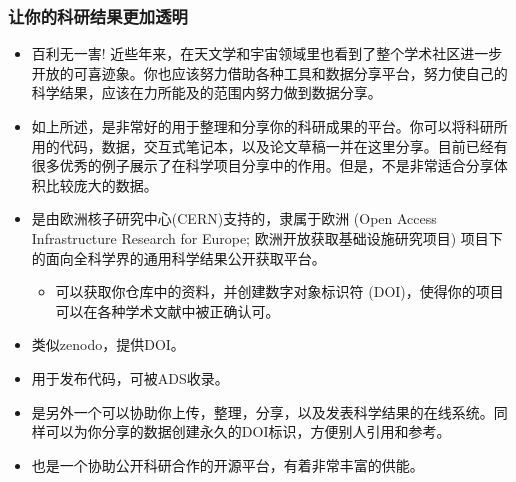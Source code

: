\documentclass[letterpaper,10pt,english]{sphinxmanual}
\begin{document}
\subsubsection{让你的科研结果更加透明}
\label{\detokenize{resource/research/getting_started_cn:id12}}\begin{itemize}
\item {} 
百利无一害!
近些年来，在天文学和宇宙领域里也看到了整个学术社区进一步开放的可喜迹象。你也应该努力借助各种工具和数据分享平台，努力使自己的科学结果，应该在力所能及的范围内努力做到数据分享。

\item {} 
如上所述，是非常好的用于整理和分享你的科研成果的平台。你可以将科研所用的代码，数据，交互式笔记本，以及论文草稿一并在这里分享。目前已经有很多优秀的例子展示了在科学项目分享中的作用。但是，不是非常适合分享体积比较庞大的数据。

\item {} 
是由欧洲核子研究中心(CERN)支持的，隶属于欧洲 (Open
Access Infrastructure Research for Europe;
欧洲开放获取基础设施研究项目)
项目下的面向全科学界的通用科学结果公开获取平台。
\begin{itemize}
\item {} 
可以获取你仓库中的资料，并创建数字对象标识符
(DOI)，使得你的项目可以在各种学术文献中被正确认可。

\end{itemize}

\item {} 
 类似zenodo，提供DOI。

\item {} 
用于发布代码，可被ADS收录。

\item {} 
是另外一个可以协助你上传，整理，分享，以及发表科学结果的在线系统。同样可以为你分享的数据创建永久的DOI标识，方便别人引用和参考。

\item {} 
也是一个协助公开科研合作的开源平台，有着非常丰富的供能。

\end{itemize}
\end{document}
